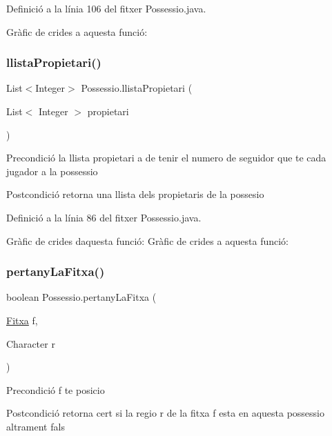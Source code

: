 Definició a la línia 106 del fitxer Possessio.\+java.

Gràfic de crides a aquesta funció\+:
\mbox{\label{class_possessio_a9173269f71b9ac357c33e571f04c84c6}} 
\subsubsection{\texorpdfstring{llista\+Propietari()}{llistaPropietari()}}
{\footnotesize\ttfamily List$<$Integer$>$ Possessio.\+llista\+Propietari (\begin{DoxyParamCaption}\item[{List$<$ Integer $>$}]{propietari }\end{DoxyParamCaption})}

\begin{DoxyPrecond}{Precondició}
la llista propietari a de tenir el numero de seguidor que te cada jugador a la possessio 
\end{DoxyPrecond}
\begin{DoxyPostcond}{Postcondició}
retorna una llista dels propietaris de la possesio 
\end{DoxyPostcond}


Definició a la línia 86 del fitxer Possessio.\+java.

Gràfic de crides d\textquotesingle{}aquesta funció\+:
Gràfic de crides a aquesta funció\+:
\mbox{\label{class_possessio_a54bf2ddd9e6e2495b43d507df3902c17}} 
\subsubsection{\texorpdfstring{pertany\+La\+Fitxa()}{pertanyLaFitxa()}}
{\footnotesize\ttfamily boolean Possessio.\+pertany\+La\+Fitxa (\begin{DoxyParamCaption}\item[{\mbox{\hyperlink{class_fitxa}{Fitxa}}}]{f,  }\item[{Character}]{r }\end{DoxyParamCaption})}

\begin{DoxyPrecond}{Precondició}
f te posicio 
\end{DoxyPrecond}
\begin{DoxyPostcond}{Postcondició}
retorna cert si la regio r de la fitxa f esta en aquesta possessio altrament fals 
\end{DoxyPostcond}


